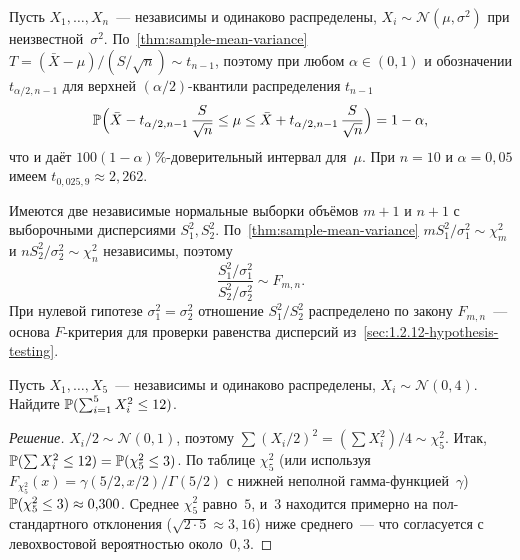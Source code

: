 \begin{example}
\label{ex:t-confidence-interval}
Пусть $X_1, \dots, X_n$~--- независимы и одинаково распределены, $X_i \sim \mathcal{N}(\mu, \sigma^2)$ при неизвестной~$\sigma^2$. По~\cref{thm:sample-mean-variance} $T = (\bar X - \mu)/(S/\sqrt n) \sim t_{n - 1}$, поэтому при любом $\alpha \in (0, 1)$ и обозначении $t_{\alpha/2, n-1}$ для верхней $(\alpha/2)$-квантили распределения $t_{n - 1}$
\[
  \mathbb{P}\Bigl(\bar X - t_{\alpha/2, n-1}\, \frac{S}{\sqrt n} \leq \mu \leq \bar X + t_{\alpha/2, n-1}\, \frac{S}{\sqrt n}\Bigr) = 1 - \alpha,
\]
что и даёт $100(1 - \alpha)\%$-доверительный интервал для~$\mu$. При $n = 10$ и $\alpha = 0{,}05$ имеем $t_{0{,}025, 9} \approx 2{,}262$.
\end{example}

\begin{example}
\label{ex:f-test-setup}
Имеются две независимые нормальные выборки объёмов $m + 1$ и $n + 1$ с выборочными дисперсиями $S_1^2, S_2^2$. По~\cref{thm:sample-mean-variance} $m S_1^2/\sigma_1^2 \sim \chi^2_m$ и $n S_2^2/\sigma_2^2 \sim \chi^2_n$ независимы, поэтому
\[
  \frac{S_1^2/\sigma_1^2}{S_2^2/\sigma_2^2} \sim F_{m, n}.
\]
При нулевой гипотезе $\sigma_1^2 = \sigma_2^2$ отношение $S_1^2/S_2^2$ распределено по закону $F_{m, n}$~--- основа $F$-критерия для проверки равенства дисперсий из~\cref{sec:1.2.12-hypothesis-testing}.
\end{example}

\begin{problem}
\label{prob:chi2-quantile}
Пусть $X_1, \dots, X_5$~--- независимы и одинаково распределены, $X_i \sim \mathcal{N}(0, 4)$. Найдите $\mathbb{P}(\sum_{i=1}^{5} X_i^2 \leq 12)$.
\end{problem}

\begin{proof}[Решение]
$X_i / 2 \sim \mathcal{N}(0, 1)$, поэтому $\sum (X_i/2)^2 = (\sum X_i^2)/4 \sim \chi^2_5$. Итак, $\mathbb{P}(\sum X_i^2 \leq 12) = \mathbb{P}(\chi^2_5 \leq 3)$. По таблице $\chi^2_5$ (или используя $F_{\chi^2_5}(x) = \gamma(5/2, x/2)/\Gamma(5/2)$ с нижней неполной гамма-функцией~$\gamma$) $\mathbb{P}(\chi^2_5 \leq 3) \approx 0{,}300$. Среднее $\chi^2_5$ равно~$5$, и~$3$ находится примерно на пол-стандартного отклонения ($\sqrt{2 \cdot 5} \approx 3{,}16$) ниже среднего~--- что согласуется с левохвостовой вероятностью около~$0{,}3$.
\end{proof}
